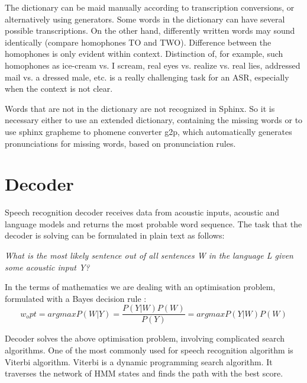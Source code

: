 \newline
The dictionary can be maid manually according to transcription conversions, or
alternatively using generators. Some words in the dictionary can have several possible transcriptions. On the other hand, differently written words 
may sound identically (compare homophones TO and TWO). Difference between the homophones is only evident within context. Distinction of, for 
example, such homophones as ice-cream vs. I scream, real eyes vs. realize vs. real lies, addressed mail vs. a dressed male, etc. is a really 
challenging task for an ASR, especially when the context is not clear.

Words that are not in the dictionary are not recognized in Sphinx. So it is
necessary either to use an extended dictionary, containing the missing words or to use 
sphinx  grapheme to phomene converter g2p, which automatically generates
pronunciations for missing words, based on pronunciation rules.  

 
\section {Decoder}
Speech recognition decoder receives data from acoustic inputs, acoustic and
language models and returns the most probable word sequence. The task that the decoder is solving can be
formulated in plain text as follows:
\begin {center}
\textit {What is the most likely sentence out of all
sentences W in the language L given some acoustic input Y? }
\end {center}
In the terms of mathematics we are dealing with an optimisation problem,
formulated with a Bayes decision rule \parencite {jurafskymartin2009}:
\[w_opt = argmax P(W|Y ) = \frac {P(Y |W)P(W)} {P(Y)} = argmax P(Y |W)P(W)\]

Decoder solves the above optimisation problem, involving complicated search algorithms. One of the most commonly used for speech recognition algorithm is 
Viterbi algorithm. Viterbi is a dynamic programming search algorithm. It traverses the network of HMM states and 
finds the path with the best score.

